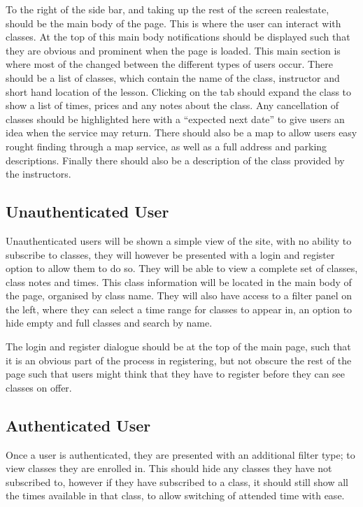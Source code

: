 \documentclass[10pt]{article}
\begin{document}
        To the right of the side bar, and taking up the rest of the screen realestate, should be the main body of the page. This is where the user can interact with classes. At the top of this main body notifications should be displayed such that they are obvious and prominent when the page is loaded. This main section is where most of the changed between the different types of users occur. There should be a list of classes, which contain the name of the class, instructor and short hand location of the lesson. Clicking on the tab should expand the class to show a list of times, prices and any notes about the class. Any cancellation of classes should be highlighted here with a ``expected next date'' to give users an idea when the service may return. There should also be a map to allow users easy rought finding through a map service, as well as a full address and parking descriptions. Finally there should also be a description of the class provided by the instructors.

      \subsection{Unauthenticated User}
        Unauthenticated users will be shown a simple view of the site, with no ability to subscribe to classes, they will however be presented with a login and register option to allow them to do so. They will be able to view a complete set of classes, class notes and times. This class information will be located in the main body of the page, organised by class name. They will also have access to a filter panel on the left, where they can select a time range for classes to appear in, an option to hide empty and full classes and search by name. 

        The login and register dialogue should be at the top of the main page, such that it is an obvious part of the process in registering, but not obscure the rest of the page such that users might think that they have to register before they can see classes on offer.

      \subsection{Authenticated User}
        Once a user is authenticated, they are presented with an additional filter type; to view classes they are enrolled in. This should hide any classes they have not subscribed to, however if they have subscribed to a class, it should still show all the times available in that class, to allow switching of attended time with ease.
\end{document}
